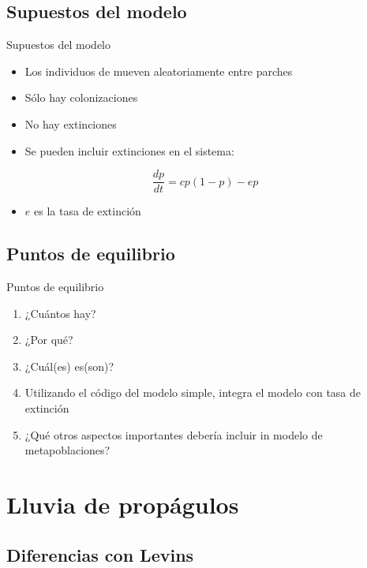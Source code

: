 \documentclass[
  11pt,
  ignorenonframetext,
]{beamer}
\providecommand{\tightlist}{%
  \setlength{\itemsep}{0pt}\setlength{\parskip}{0pt}}
\begin{document}
\hypertarget{supuestos-del-modelo}{%
\subsection{Supuestos del modelo}\label{supuestos-del-modelo}}

\begin{frame}{Supuestos del modelo}
\begin{itemize}
\item
  Los individuos de mueven aleatoriamente entre parches
\item
  Sólo hay colonizaciones
\item
  No hay extinciones
\item
  Se pueden incluir extinciones en el sistema:
\end{itemize}

\[ \frac{dp}{dt} = cp(1-p) - ep\]

\begin{itemize}
\tightlist
\item
  \(e\) es la tasa de extinción
\end{itemize}
\end{frame}

\hypertarget{puntos-de-equilibrio}{%
\subsection{Puntos de equilibrio}\label{puntos-de-equilibrio}}

\begin{frame}{Puntos de equilibrio}
\begin{enumerate}
\item
  ¿Cuántos hay?
\item
  ¿Por qué?
\item
  ¿Cuál(es) es(son)?
\item
  Utilizando el código del modelo simple, integra el modelo con tasa de
  extinción
\item
  ¿Qué otros aspectos importantes debería incluir in modelo de
  metapoblaciones?
\end{enumerate}
\end{frame}

\hypertarget{lluvia-de-propuxe1gulos}{%
\section{Lluvia de propágulos}\label{lluvia-de-propuxe1gulos}}

\hypertarget{diferencias-con-levins}{%
\subsection{Diferencias con Levins}\label{diferencias-con-levins}}
\end{document}
